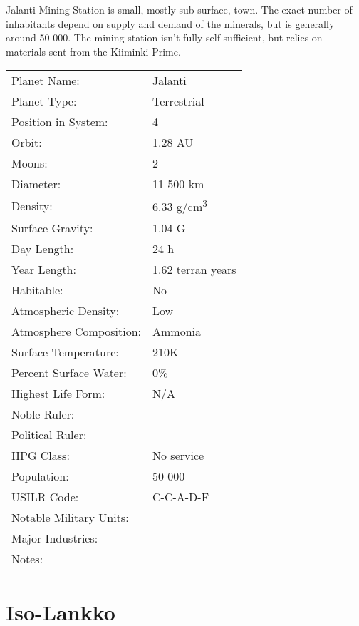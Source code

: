 \documentclass{tufte-book}
\begin{document}
Jalanti Mining Station is small, mostly sub-surface, town. The exact
number of inhabitants depend on supply and demand of the minerals, but
is generally around 50 000. The mining station isn't fully
self-sufficient, but relies on materials sent from the Kiiminki Prime.

\bigskip
\begin{minipage}{\textwidth}
\begin{center}
\begin{tabular}{ll}
\toprule
Planet Name: & Jalanti \\
Planet Type: & Terrestrial \\
Position in System: & 4 \\
Orbit: & 1.28 AU \\
Moons: & 2 \\
Diameter: & 11 500 km \\
Density: & 6.33 g/cm\textsuperscript{3} \\
Surface Gravity: & 1.04 G \\
Day Length: & 24 h \\
Year Length: & 1.62 terran years \\
Habitable: & No \\
\quad Atmospheric Density: & Low \\
\quad Atmosphere Composition: & Ammonia \\
\quad Surface Temperature: & 210K \\
\quad Percent Surface Water: & 0\% \\
\quad Highest Life Form: & N/A \\
\toprule
Noble Ruler: & \\
Political Ruler: & \\
HPG Class: & No service \\
Population: & 50 000 \\
USILR Code: & C-C-A-D-F \\
Notable Military Units: & \\
Major Industries: & \\
Notes: & \\

\bottomrule
\end{tabular}
\end{center}
\end{minipage}

\section{Iso-Lankko}
\end{document}
